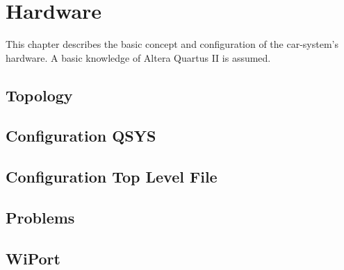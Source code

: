 \chapter{Hardware}
This chapter describes the basic concept and configuration of the car-system's hardware. A basic knowledge of Altera Quartus II is assumed.
\section{Topology}

\section{Configuration QSYS}

\section{Configuration Top Level File}

\section{Problems}

\section{WiPort}